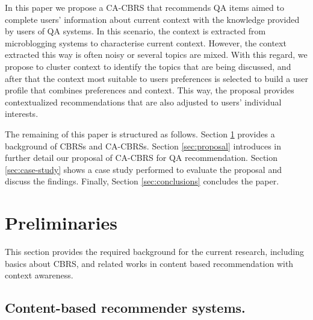 \documentclass[preprint]{elsarticle}
\begin{document}
\begin{spacing}{1.5}
In this paper we propose a CA-CBRS that recommends QA items aimed to complete users' information about current context with the knowledge provided by users of QA systems. In this scenario, the context is extracted from microblogging systems to characterise current context. However, the context extracted this way is often noisy or several topics are mixed. With this regard, we propose to cluster context to identify the topics that are being discussed, and after that the context most suitable to users preferences is selected to build a user profile that combines preferences and context. This way, the proposal provides contextualized recommendations that are also adjusted to users' individual interests.

The remaining of this paper is structured as follows. Section \ref{sec:preliminaries} provides a background of CBRSs and CA-CBRSs. Section \ref{sec:proposal} introduces in further detail our proposal of CA-CBRS for QA recommendation. Section \ref{sec:case-study} shows a case study performed to evaluate the proposal and discuss the findings. Finally, Section \ref{sec:conclusions} concludes the paper.



\section{Preliminaries}
\label{sec:preliminaries}

This section provides the required background for the current research, including basics about CBRS, and related works in content based recommendation with context awareness.

\subsection{Content-based recommender systems.}


\end{spacing}
\end{document}
